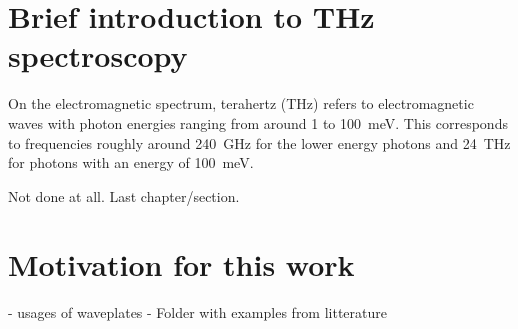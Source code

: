 \section{Brief introduction to THz spectroscopy}
On the electromagnetic spectrum, terahertz (THz) refers to electromagnetic waves with photon energies ranging from around 1 to \SI{100}{\milli \electronvolt}. This corresponds to frequencies roughly around \SI{240}{\giga \hertz} for the lower energy photons and \SI{24}{\tera \hertz} for photons with an energy of \SI{100}{\milli \electronvolt}.

Not done at all. Last chapter/section.

\section{Motivation for this work}
- usages of waveplates
- Folder with examples from litterature
